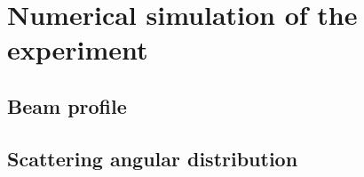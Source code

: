 \documentclass[../../main/main.tex]{subfiles}
\begin{document}
\section{Numerical simulation of the experiment}



\subsection{Beam profile}



\subsection{Scattering angular distribution}
\end{document}
